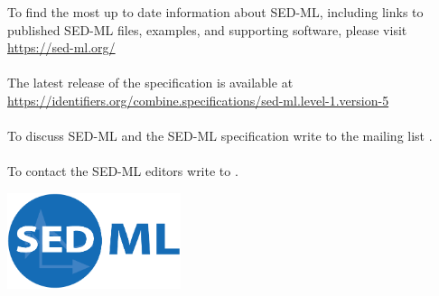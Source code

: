 \begin{titlepage}
\begin{center}
\vspace{1.2in}

\normalsize
\begin{minipage}{5.5in}
\begin{center}
  To find the most up to date information about SED-ML, including links to published SED-ML files, examples, and supporting software, please visit\linebreak
  \url{https://sed-ml.org/}

  \paragraph*{}
  The latest release of the \currentLV specification is available at
  \url{https://identifiers.org/combine.specifications/sed-ml.level-1.version-5}

  \paragraph*{}
  To discuss SED-ML and the SED-ML specification write to the mailing list .

  \paragraph*{}
  To contact the SED-ML editors write to .
\end{center}
\end{minipage}
\vfill


\centerline{\includegraphics[width=2in]{images/logoSedml.png}}

\end{center}

\end{titlepage}

%
%

\setcounter{page}{2}



